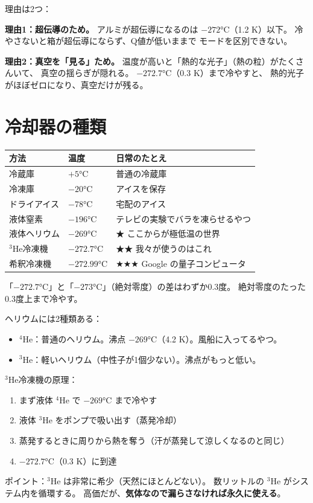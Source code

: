 \documentclass[12pt,a4paper]{article}
\begin{document}
理由は2つ：

\textbf{理由1：超伝導のため。}
アルミが超伝導になるのは $-272$°C（1.2 K）以下。
冷やさないと箱が超伝導にならず、Q値が低いままで
モードを区別できない。

\textbf{理由2：真空を「見る」ため。}
温度が高いと「熱的な光子」（熱の粒）がたくさんいて、
真空の揺らぎが隠れる。
$-272.7$°C（0.3 K）まで冷やすと、
熱的光子がほぼゼロになり、真空だけが残る。

\section{冷却器の種類}

\begin{naruhodox}[冷やし方の階層]
\begin{center}
\renewcommand{\arraystretch}{1.4}
\begin{tabular}{lll}
\toprule
方法 & 温度 & 日常のたとえ \\
\midrule
冷蔵庫 & $+5$°C & 普通の冷蔵庫 \\
冷凍庫 & $-20$°C & アイスを保存 \\
ドライアイス & $-78$°C & 宅配のアイス \\
液体窒素 & $-196$°C & テレビの実験でバラを凍らせるやつ \\
液体ヘリウム & $-269$°C & ★ ここからが極低温の世界 \\
$^3$He冷凍機 & $-272.7$°C & ★★ 我々が使うのはこれ \\
希釈冷凍機 & $-272.99$°C & ★★★ Google の量子コンピュータ \\
\bottomrule
\end{tabular}
\end{center}

「$-272.7$°C」と「$-273$°C」（絶対零度）の差はわずか0.3度。
絶対零度のたった0.3度上まで冷やす。
\end{naruhodox}

\begin{naruhodox}[$^3$He冷凍機の仕組み]

ヘリウムには2種類ある：
\begin{itemize}
\item $^4$He：普通のヘリウム。沸点 $-269$°C（4.2 K）。風船に入ってるやつ。
\item $^3$He：軽いヘリウム（中性子が1個少ない）。沸点がもっと低い。
\end{itemize}

$^3$He冷凍機の原理：
\begin{enumerate}
\item まず液体 $^4$He で $-269$°C まで冷やす
\item 液体 $^3$He をポンプで吸い出す（蒸発冷却）
\item 蒸発するときに周りから熱を奪う（汗が蒸発して涼しくなるのと同じ）
\item $-272.7$°C（0.3 K）に到達
\end{enumerate}

ポイント：$^3$He は非常に希少（天然にほとんどない）。
数リットルの $^3$He がシステム内を循環する。
高価だが、\textbf{気体なので漏らさなければ永久に使える}。
\end{naruhodox}
\end{document}
